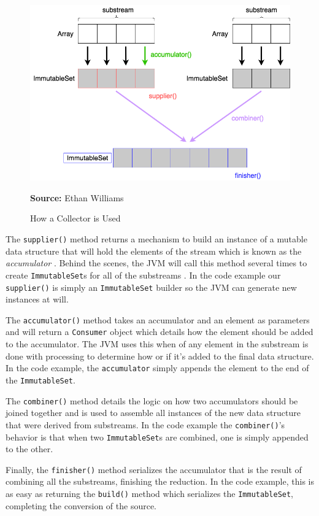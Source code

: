 \documentclass[oneside, 12pt]{article}
\newcommand{\source}[1]{\textbf{Source:} {#1} }
\begin{document}
\begin{figure}[H]
\centering
\includegraphics[width=13cm]{images/collector.png}
\caption{How a Collector is Used}
\source{Ethan Williams}
\label{fig:collector}
\end{figure}

The \verb|supplier()| method returns a mechanism to build an instance of a mutable data structure that will hold the elements of the stream which is known as the \textit{accumulator} \autocite{custom_collector}. Behind the scenes, the JVM will call this method several times to create \verb|ImmutableSet|s for all of the substreams \autocite{}.  In the code example our \verb|supplier()| is simply an \verb|ImmutableSet| builder so the JVM can generate new instances at will.

The \verb|accumulator()| method takes an accumulator and an element as parameters and will return a \verb|Consumer| object which details how the element should be added to the accumulator. The JVM uses this when of any element in the substream is done with processing to determine how or if it's added to the final data structure. In the code example, the \verb|accumulator| simply appends the element to the end of the \verb|ImmutableSet|.

The \verb|combiner()| method details the logic on how two accumulators should be joined together and is used to assemble all instances of the new data structure that were derived from substreams. In the code example the \verb|combiner()|'s behavior is that when two \verb|ImmutableSet|s are combined, one is simply appended to the other.

Finally, the \verb|finisher()| method serializes the accumulator that is the result of combining all the substreams, finishing the reduction. In the code example, this is as easy as returning the \verb|build()| method which serializes the \verb|ImmutableSet|, completing the conversion of the source.
\end{document}
